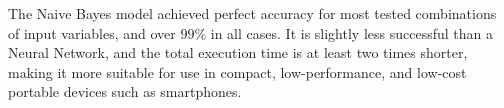 \documentclass[sn-mathphys-num]{sn-jnl}%
\begin{document}
The Naive Bayes model achieved perfect accuracy for most tested combinations of input variables, and over $99\%$ in all cases. It is slightly less successful than a Neural Network, and the total execution time is at least two times shorter, making it more suitable for use in compact, low-performance, and low-cost portable devices such as smartphones.


\end{document}

